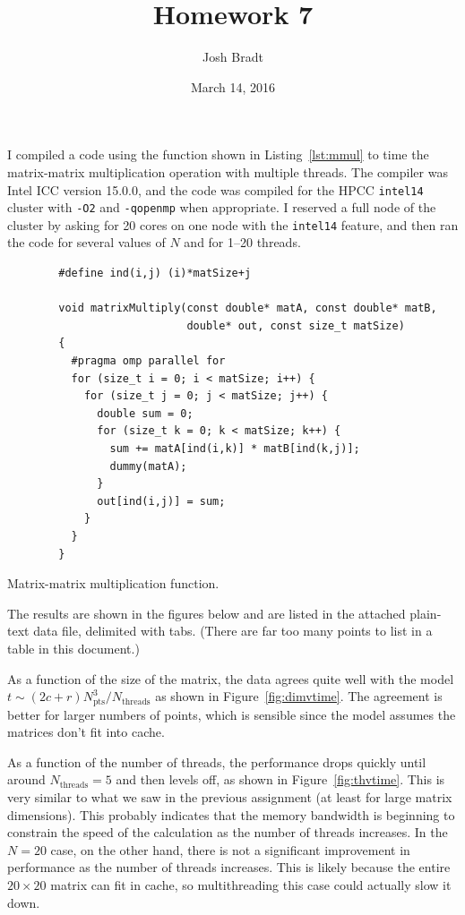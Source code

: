 \documentclass{article}
\title{Homework 7}
\author{Josh Bradt}
\date{March 14, 2016}
\begin{document}
\maketitle

I compiled a code using the function shown in Listing~\ref{lst:mmul} to time the matrix-matrix multiplication operation with multiple threads. The compiler was Intel ICC version 15.0.0, and the code was compiled for the HPCC \texttt{intel14} cluster with \texttt{-O2} and \texttt{-qopenmp} when appropriate. I reserved a full node of the cluster by asking for 20 cores on one node with the \texttt{intel14} feature, and then ran the code for several values of $N$ and for 1--20 threads.

\begin{listing}[p]
    \begin{verbatim}
        #define ind(i,j) (i)*matSize+j

        void matrixMultiply(const double* matA, const double* matB,
                            double* out, const size_t matSize)
        {
          #pragma omp parallel for
          for (size_t i = 0; i < matSize; i++) {
            for (size_t j = 0; j < matSize; j++) {
              double sum = 0;
              for (size_t k = 0; k < matSize; k++) {
                sum += matA[ind(i,k)] * matB[ind(k,j)];
                dummy(matA);
              }
              out[ind(i,j)] = sum;
            }
          }
        }
    \end{verbatim}
    \caption{Matrix-matrix multiplication function.}
    \label{lst:mmul}
\end{listing}

The results are shown in the figures below and are listed in the attached plain-text data file, delimited with tabs. (There are far too many points to list in a table in this document.)

As a function of the size of the matrix, the data agrees quite well with the model $t\sim(2c+r)N_\text{pts}^3/N_\text{threads}$ as shown in Figure~\ref{fig:dimvtime}. The agreement is better for larger numbers of points, which is sensible since the model assumes the matrices don't fit into cache.

As a function of the number of threads, the performance drops quickly until around $N_\text{threads} = 5$ and then levels off, as shown in Figure~\ref{fig:thvtime}. This is very similar to what we saw in the previous assignment (at least for large matrix dimensions). This probably indicates that the memory bandwidth is beginning to constrain the speed of the calculation as the number of threads increases. In the $N=20$ case, on the other hand, there is not a significant improvement in performance as the number of threads increases. This is likely because the entire $20\times 20$ matrix can fit in cache, so multithreading this case could actually slow it down.
\end{document}
